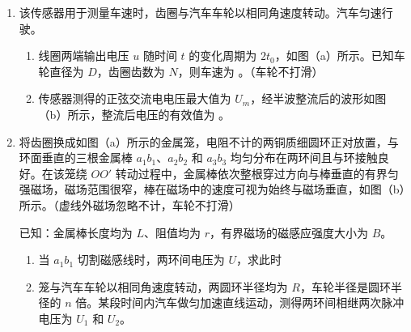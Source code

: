 \documentclass[\gkver]{gaokaozhenti}
\begin{document}
\begin{enumerate}
\begin{enumerate}
	\onepicture[w=6.5cm, align=right]{}

	{先 $\varphi_{a}$ 高于 $\varphi_{b}$，后 $\varphi_{a}$ 低于 $\varphi_{b}$}
	{$\varphi_{a}$ 始终低于 $\varphi_{b}$}
	{先 $\varphi_{a}$ 低于 $\varphi_{b}$，后 $\varphi_{a}$ 高于 $\varphi_{b}$}

	\item
	该传感器用于测量车速时，齿圈与汽车车轮以相同角速度转动。汽车匀速行驶。

	\begin{enumerate}
		\item
		线圈两端输出电压 $u$ 随时间 $t$ 的变化周期为 $2t_{0}$，如图（a）所示。已知车轮直径为 $D$，齿圈齿数为 $N$，则车速为 。（车轮不打滑）

		\onepicture[w=5.5cm, align=right]{}

		\item
		传感器测得的正弦交流电电压最大值为 $U_{m}$，经半波整流后的波形如图（b）所示，整流后电压的有效值为 。

		\onepicture[w=5.5cm, align=right]{}
	\end{enumerate}

	\item
	将齿圈换成如图（a）所示的金属笼，电阻不计的两铜质细圆环正对放置，与环面垂直的三根金属棒 $a_{1}b_{1}$、$a_{2}b_{2}$ 和 $a_{3}b_{3}$ 均匀分布在两环间且与环接触良好。在该笼绕 $OO'$ 转动过程中，金属棒依次整根穿过方向与棒垂直的有界匀强磁场，磁场范围很窄，棒在磁场中的速度可视为始终与磁场垂直，如图（b）所示。（虚线外磁场忽略不计，车轮不打滑）

	\onepicture[w=9.0cm, align=right]{}

	已知：金属棒长度均为 $L$、阻值均为 $r$，有界磁场的磁感应强度大小为 $B$。

	\begin{enumerate}
		\item
		当 $a_{1}b_{1}$ 切割磁感线时，两环间电压为 $U$，求此时


		\item
		笼与汽车车轮以相同角速度转动，两圆环半径均为 $R$，车轮半径是圆环半径的 $n$ 倍。某段时间内汽车做匀加速直线运动，测得两环间相继两次脉冲电压为 $U_{1}$ 和 $U_{2}$。


\end{enumerate}
\end{enumerate}
\end{enumerate}
\end{document}
